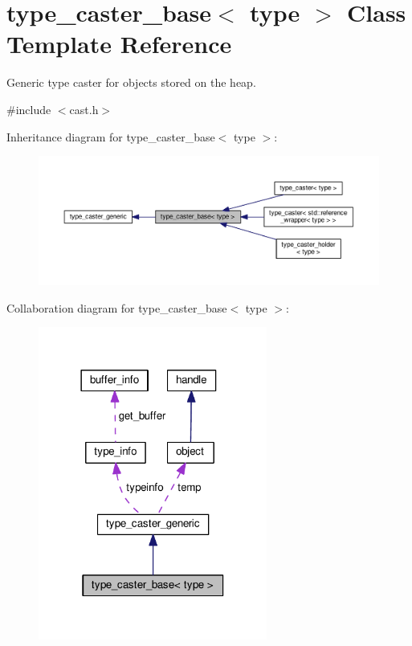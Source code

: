 \hypertarget{classtype__caster__base}{}\section{type\+\_\+caster\+\_\+base$<$ type $>$ Class Template Reference}
\label{classtype__caster__base}


Generic type caster for objects stored on the heap.  




{\ttfamily \#include $<$cast.\+h$>$}



Inheritance diagram for type\+\_\+caster\+\_\+base$<$ type $>$\+:
\nopagebreak
\begin{figure}[H]
\begin{center}
\leavevmode
\includegraphics[width=350pt]{classtype__caster__base__inherit__graph}
\end{center}
\end{figure}


Collaboration diagram for type\+\_\+caster\+\_\+base$<$ type $>$\+:
\nopagebreak
\begin{figure}[H]
\begin{center}
\leavevmode
\includegraphics[width=213pt]{classtype__caster__base__coll__graph}
\end{center}
\end{figure}
